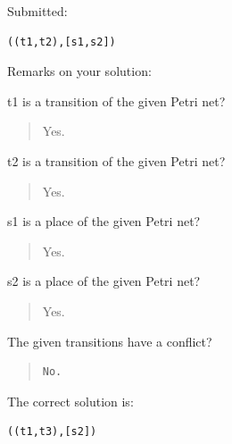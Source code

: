 Submitted:


\begin{verbatim}
((t1,t2),[s1,s2])
\end{verbatim}


Remarks on your solution:

t1 is a transition of the given Petri net?\begin{quote}Yes.\end{quote}t2 is a transition of the given Petri net?\begin{quote}Yes.\end{quote}s1 is a place of the given Petri net?\begin{quote}Yes.\end{quote}s2 is a place of the given Petri net?\begin{quote}Yes.\end{quote}The given transitions have a conflict?

\begin{quote}
\begin{verbatim}
No.
\end{verbatim}
\end{quote}

The correct solution is:
\begin{verbatim}
((t1,t3),[s2])
\end{verbatim}


